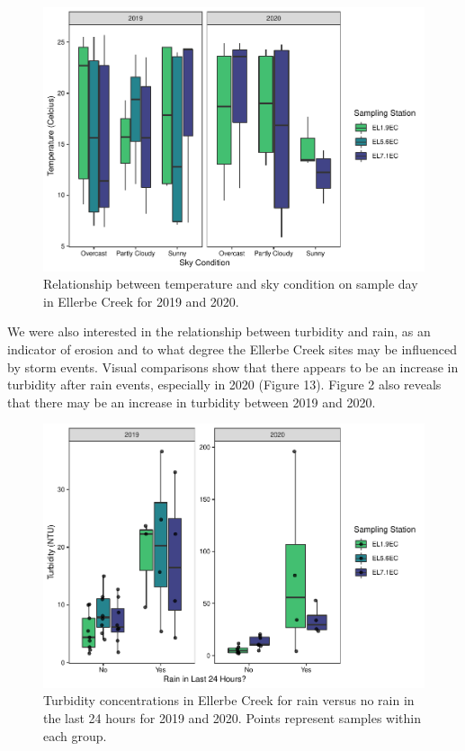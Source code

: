 \documentclass[
  12pt,
]{article}
\begin{document}
\begin{figure}
\centering
\includegraphics{August_Lindborg_ENV872_Project_files/figure-latex/unnamed-chunk-13-1.pdf}
\caption{Relationship between temperature and sky condition on sample
day in Ellerbe Creek for 2019 and 2020.}
\end{figure}

\newpage

We were also interested in the relationship between turbidity and rain,
as an indicator of erosion and to what degree the Ellerbe Creek sites
may be influenced by storm events. Visual comparisons show that there
appears to be an increase in turbidity after rain events, especially in
2020 (Figure 13). Figure 2 also reveals that there may be an increase in
turbidity between 2019 and 2020.

\begin{figure}
\centering
\includegraphics{August_Lindborg_ENV872_Project_files/figure-latex/unnamed-chunk-14-1.pdf}
\caption{Turbidity concentrations in Ellerbe Creek for rain versus no
rain in the last 24 hours for 2019 and 2020. Points represent samples
within each group.}
\end{figure}
\end{document}
